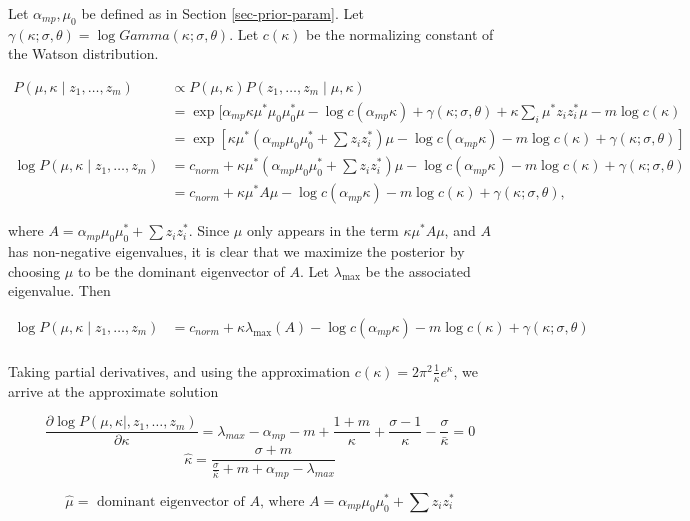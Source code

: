 Let $\alpha_{mp}, \mu_0$ be defined as in Section
\ref{sec-prior-param}. Let $\gamma(\kappa;\sigma,\theta) = \log
Gamma(\kappa; \sigma,\theta)$.  Let $c(\kappa)$ be the normalizing constant
of the Watson distribution.

\begin{align*}
P(\mu, \kappa \mid z_1,\dots,z_m) &\propto
P(\mu, \kappa) P(z_1,\dots,z_m\mid \mu, \kappa) \\
&= \exp[ \alpha_{mp}\kappa \mu^* \mu_0 \mu_0^* \mu
- \log c(\alpha_{mp} \kappa) + \gamma(\kappa; \sigma,\theta)
+ \kappa \sum_i \mu^* z_i z_i^* \mu - m \log c(\kappa)
\\
&= \exp[
\kappa \mu^* (\alpha_{mp} \mu_0 \mu_0^* + \sum z_i z_i^*)\mu
- \log c(\alpha_{mp} \kappa) - m \log c(\kappa) + 
\gamma(\kappa; \sigma, \theta) ]\\
\log P(\mu, \kappa \mid z_1,\dots,z_m) &= 
c_{norm} + 
\kappa \mu^* (\alpha_{mp} \mu_0 \mu_0^* + \sum z_i z_i^*)\mu
- \log c(\alpha_{mp} \kappa) - m \log c(\kappa) + 
\gamma(\kappa; \sigma, \theta) \\
&= c_{norm} + 
\kappa \mu^* A \mu
- \log c(\alpha_{mp} \kappa) - m \log c(\kappa) + 
\gamma(\kappa; \sigma, \theta),
\end{align*}

where $A = \alpha_{mp} \mu_0 \mu_0^* + \sum z_i z_i^*$.
Since $\mu$ only appears in the term $\kappa \mu^* A \mu$,
and $A$ has non-negative eigenvalues, it is clear
that we maximize the posterior by choosing $\mu$ to be
the dominant eigenvector of $A$.
Let $\lambda_{\max}$ be the associated eigenvalue. Then

\begin{align*}
\log P(\mu, \kappa \mid z_1,\dots,z_m) &= 
c_{norm} + \kappa \lambda_{\max}(A) - 
\log c(\alpha_{mp} \kappa) - m \log c(\kappa) + 
\gamma(\kappa; \sigma, \theta)\\
\end{align*}

Taking partial derivatives, and using the approximation
$c(\kappa) = 2 \pi^2 \frac{1}{\kappa} e^\kappa$,
we arrive at the approximate solution

$$
\frac{\partial \log P(\mu, \kappa \mid, z_1,\dots,z_m)}
{\partial \kappa} = 
\lambda_{max} - \alpha_{mp} -m + \frac{1+m}{\kappa} + 
\frac{\sigma-1}{\kappa} - \frac{\sigma}{\bar{\kappa}} = 0
$$
$$
\widehat{\kappa} = \frac{\sigma+m}{\frac{\sigma}{\bar{\kappa}}
+ m + \alpha_{mp} - \lambda_{max}}
$$

$$
\widehat{\mu} = \mbox{ dominant eigenvector of }
A\mbox{, where } A = \alpha_{mp} \mu_0 \mu_0^* + \sum z_i z_i^*
$$


